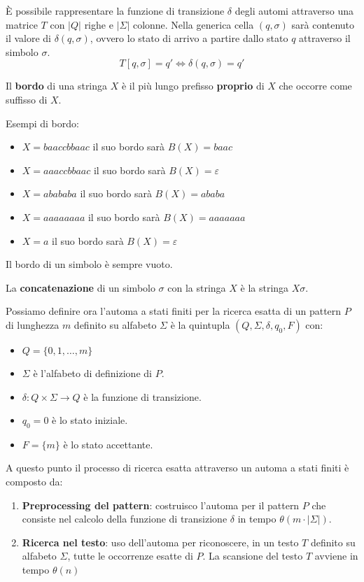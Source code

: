 È possibile rappresentare la funzione di transizione $\delta$ degli automi attraverso
una matrice $T$ con $|Q|$ righe e $|\Sigma|$ colonne. Nella generica cella
$(q, \sigma)$ sarà contenuto il valore di $\delta(q, \sigma)$, ovvero lo stato di
arrivo a partire dallo stato $q$ attraverso il simbolo $\sigma$.
\begin{equation}
    T[q,\sigma] = q'\iff \delta(q,\sigma) = q'
\end{equation}
\begin{definizione}
    Il \textbf{bordo} di una stringa $X$ è il più lungo prefisso \textbf{proprio}
    di $X$ che occorre come suffisso di $X$.
\end{definizione}
\begin{esempio}
    Esempi di bordo:
    \begin{itemize}
        \item $X = baaccbbaac$ il suo bordo sarà $B(X) = baac$
        \item $X = aaaccbbaac$ il suo bordo sarà $B(X) = \varepsilon$
        \item $X = abababa$ il suo bordo sarà $B(X) = ababa$
        \item $X = aaaaaaaa$ il suo bordo sarà $B(X) = aaaaaaa$
        \item $X = a$ il suo bordo sarà $B(X) = \varepsilon$
    \end{itemize}
\end{esempio}
\begin{nota}
    Il bordo di un simbolo è sempre vuoto.
\end{nota}
\begin{definizione}
    La \textbf{concatenazione} di un simbolo $\sigma$ con la stringa $X$ è la
    stringa $X\sigma$.
\end{definizione}
Possiamo definire ora l'automa a stati finiti per la ricerca esatta di un pattern
$P$ di lunghezza $m$ definito su alfabeto $\Sigma$ è la quintupla $(Q, \Sigma,
    \delta, q_0, F)$ con:
\begin{itemize}
    \item $Q = \{0, 1, \dots, m\}$
    \item $\Sigma$ è l'alfabeto di definizione di $P$.
    \item $\delta: Q \times \Sigma \to Q$ è la funzione di transizione.
    \item $q_0 = 0$ è lo stato iniziale.
    \item $F = \{m\}$ è lo stato accettante.
\end{itemize}
A questo punto il processo di ricerca esatta attraverso un automa a stati finiti
è composto da:
\begin{enumerate}
    \item \textbf{Preprocessing del pattern}: costruisco l'automa per il pattern
          $P$ che consiste nel calcolo della funzione di transizione $\delta$ in
          tempo $\theta(m \cdot |\Sigma|)$.
    \item \textbf{Ricerca nel testo}: uso dell'automa per riconoscere, in un testo
          $T$ definito su alfabeto $\Sigma$, tutte le occorrenze esatte di $P$. La
          scansione del testo $T$ avviene in tempo $\theta(n)$
\end{enumerate}

